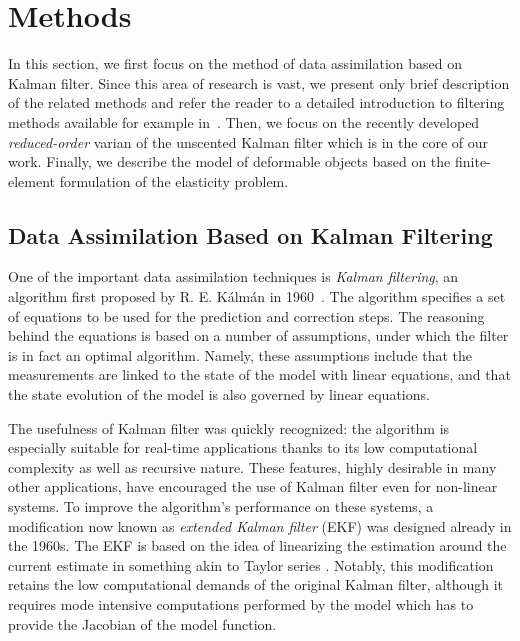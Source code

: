 \newcommand{\msa}{\mathcal{M}_1}
\newcommand{\msb}{\mathcal{M}_2}
\newcommand{\eexp}{E_\text{exp}}
\newcommand{\evar}{E_\text{var}}

\section{Methods}
\label{s:method}
In this section, we first focus on the method of data assimilation based on Kalman filter. 
Since this area of research is vast, we present only 
brief description of the related methods and refer the reader to a detailed introduction to
filtering methods available for example in~\cite{grewal2014kalman, welch2006introduction}. Then, we focus on the 
recently developed \emph{reduced-order} varian of the unscented Kalman filter which is in the core of our work. 
Finally, we describe the model of deformable objects 
based on the finite-element formulation of the elasticity problem. 


\subsection{Data Assimilation Based on Kalman Filtering}
\label{sm:kalman}
One of the important data assimilation techniques is \emph{Kalman filtering},
an algorithm first proposed by R. E. K\'{a}lm\'{a}n in 1960~\cite{kalman1960new}. The algorithm specifies a set of equations to be used for the prediction and correction steps. The reasoning behind the equations is based on a number of assumptions, under which the filter is in fact an optimal algorithm. Namely, these assumptions include  that the measurements are linked to the state of the model with linear equations, and that the state evolution of the model is also governed by linear equations.

The usefulness of Kalman filter was quickly recognized: the algorithm is especially suitable for real-time applications thanks to its low computational complexity as well as recursive nature. These features, highly desirable in many other applications, have encouraged the use of Kalman filter even for non-linear systems. To improve the algorithm's performance on these systems, a modification now known as \emph{extended Kalman filter} (EKF) was designed already in the 1960s. The EKF is based on the idea of linearizing the estimation around the current estimate in something akin to Taylor series \cite{welch2006introduction}. Notably, this modification retains the low computational demands of the original Kalman filter, although it requires mode intensive computations performed by the model which has to provide the Jacobian of the model function. 

